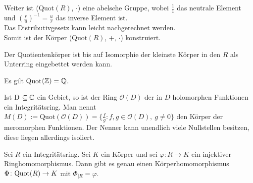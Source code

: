 {Weiter ist (Quot$(R)$, $\cdot$) eine abelsche Gruppe, wobei $\frac{1}{1}$ das neutrale Element und $\left(\frac{r}{u}\right)^{-1} = \frac{u}{r}$ das inverse Element ist. \\
Das Distributivgesetz kann leicht nachgerechnet werden.\\
Somit ist der Körper (Quot$(R)$, +, $\cdot$) konstruiert.
}
%
%
% 
%
%
\begin{bem}
Der Quotientenkörper ist bis auf Isomorphie der kleinste Körper in den $R$ als Unterring eingebettet werden kann.
\end{bem}
%
%
%
%
\begin{bsp}
Es gilt Quot$(\mathbb{Z}) = \mathbb{Q}$.

\end{bsp}
%
%
%
\begin{bsp}
Ist D $\subseteq \mathbb{C}$ ein Gebiet, so ist der Ring $ \mathcal{O} (D) $ der in $D$ holomorphen Funktionen ein Integritätsring. Man nennt
$ M \left(D\right) := \text{Quot}\left( \mathcal{O} \left( D \right)\right) = \lbrace \frac{f}{g}: f,g \in \mathcal{O} (D), ~g \neq 0\rbrace$ den Körper der meromorphen Funktionen. Der Nenner kann unendlich viele Nullstellen besitzen, diese liegen allerdings isoliert. 
\end{bsp}
%
%
%
\begin{satz}\label{UniverselleEigenschaftQuot}
Sei $R$ ein Integritätsring. Sei $K$ ein Körper und sei $\varphi\colon R\to K$ ein injektiver Ringhomomorphismus. Dann gibt es genau einen Körperhomomorphismus $\Phi\colon \textup{Quot}(R) \to K$ mit $\Phi_{|R}=\varphi$.  
\end{satz}
